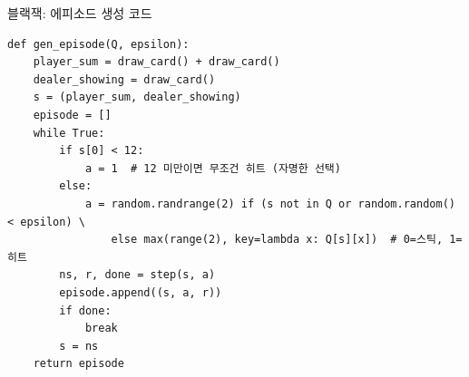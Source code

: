 \begin{frame}[fragile]{블랙잭: 에피소드 생성 코드}
\begin{lstlisting}
def gen_episode(Q, epsilon):
    player_sum = draw_card() + draw_card()
    dealer_showing = draw_card()
    s = (player_sum, dealer_showing)
    episode = []
    while True:
        if s[0] < 12:
            a = 1  # 12 미만이면 무조건 히트 (자명한 선택)
        else:
            a = random.randrange(2) if (s not in Q or random.random() < epsilon) \
                else max(range(2), key=lambda x: Q[s][x])  # 0=스틱, 1=히트
        ns, r, done = step(s, a)
        episode.append((s, a, r))
        if done:
            break
        s = ns
    return episode
\end{lstlisting}
  

\end{frame}
